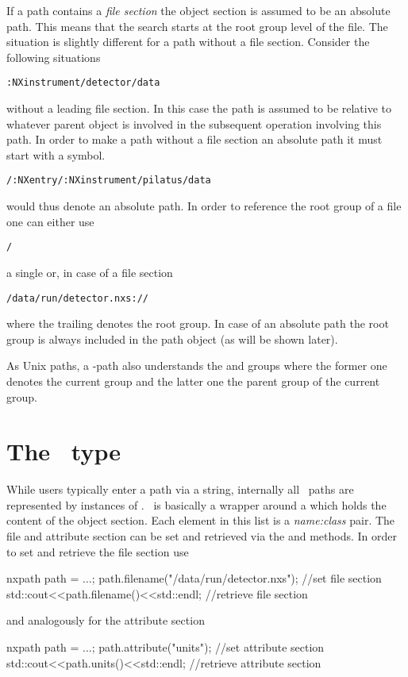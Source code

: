 If a path contains a \emph{file section} 
the object section is assumed to be an absolute path. This means that 
the search starts at the root group level of the file. 
The situation is slightly different for a path without a file section. 
Consider the following situations
\begin{verbatim}
:NXinstrument/detector/data 
\end{verbatim}
without a leading file section. In this case the path is assumed to 
be relative to whatever parent object is involved in the subsequent 
operation involving this path. 
In order to make a path without a file section an absolute path it must 
start with a \cpp{/} symbol. 
\begin{verbatim}
/:NXentry/:NXinstrument/pilatus/data
\end{verbatim}
would thus denote an absolute path.
In order to reference the root group of a file one can either use 
\begin{verbatim}
/
\end{verbatim}
a single \cpp{/} or, in case of a file section
\begin{verbatim}
/data/run/detector.nxs://
\end{verbatim}
where the trailing \cpp{://} denotes the root group. In case of an absolute path
the root group is always included in the path object (as will be shown later). 

As Unix paths, a \nexus-path also understands the  and  groups 
where the former one denotes the current group and the latter one the parent 
group of the current group.

\section{The \nxpath\ type}

While users typically enter a path via a string, internally all \nexus\ paths 
are represented by instances of \nxpath. \nxpath\ is basically a wrapper around 
a  which holds the content of the object section. 
Each element in this list is a \emph{name:class} pair. The file and attribute
section can be set and retrieved via the  and 
methods. In order to set and retrieve the file section use
\begin{cppcode}
nxpath path = ...;
path.filename("/data/run/detector.nxs"); //set file section
std::cout<<path.filename()<<std::endl;   //retrieve file section
\end{cppcode}
and analogously for the attribute section
\begin{cppcode}
nxpath path = ...;
path.attribute("units");              //set attribute section
std::cout<<path.units()<<std::endl;   //retrieve attribute section
\end{cppcode}

